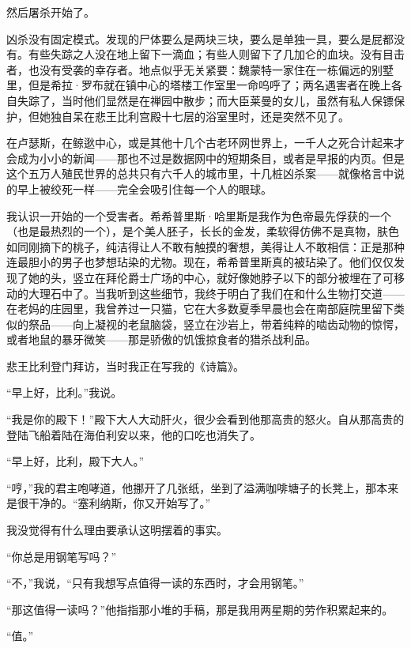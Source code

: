 \documentclass[AutoFakeBold=true]{book}
\begin{document}
然后屠杀开始了。

\vspace*{1em}

凶杀没有固定模式。发现的尸体要么是两块三块，要么是单独一具，要么是屁都没有。有些失踪之人没在地上留下一滴血；有些人则留下了几加仑的血块。没有目击者，也没有受袭的幸存者。地点似乎无关紧要：魏蒙特一家住在一栋偏远的别墅里，但是希拉·罗布就在镇中心的塔楼工作室里一命呜呼了；两名遇害者在晚上各自失踪了，当时他们显然是在禅园中散步；而大臣莱曼的女儿，虽然有私人保镖保护，但她独自呆在悲王比利宫殿十七层的浴室里时，还是突然不见了。

在卢瑟斯，在鲸逖中心，或是其他十几个古老环网世界上，一千人之死合计起来才会成为小小的新闻——那也不过是数据网中的短期条目，或者是早报的内页。但是这个五万人殖民世界的总共只有六千人的城市里，十几桩凶杀案——就像格言中说的早上被绞死一样——完全会吸引住每一个人的眼球。

我认识一开始的一个受害者。希希普里斯·哈里斯是我作为色帝最先俘获的一个（也是最热烈的一个），是个美人胚子，长长的金发，柔软得仿佛不是真物，肤色如同刚摘下的桃子，纯洁得让人不敢有触摸的奢想，美得让人不敢相信：正是那种连最胆小的男子也梦想玷染的尤物。现在，希希普里斯真的被玷染了。他们仅仅发现了她的头，竖立在拜伦爵士广场的中心，就好像她脖子以下的部分被埋在了可移动的大理石中了。当我听到这些细节，我终于明白了我们在和什么生物打交道——在老妈的庄园里，我曾养过一只猫，它在大多数夏季早晨也会在南部庭院里留下类似的祭品——向上凝视的老鼠脑袋，竖立在沙岩上，带着纯粹的啮齿动物的惊愕，或者地鼠的暴牙微笑——那是骄傲的饥饿掠食者的猎杀战利品。

\vspace*{1em}

悲王比利登门拜访，当时我正在写我的《诗篇》。

``早上好，比利。''我说。

``我是你的殿下！''殿下大人大动肝火，很少会看到他那高贵的怒火。自从那高贵的登陆飞船着陆在海伯利安以来，他的口吃也消失了。

``早上好，比利，殿下大人。''

``哼，''我的君主咆哮道，他挪开了几张纸，坐到了溢满咖啡塘子的长凳上，那本来是很干净的。``塞利纳斯，你又开始写了。''

我没觉得有什么理由要承认这明摆着的事实。

``你总是用钢笔写吗？''

``不，''我说，``只有我想写点值得一读的东西时，才会用钢笔。''

``那这值得一读吗？''他指指那小堆的手稿，那是我用两星期的劳作积累起来的。

``值。''
\end{document}
